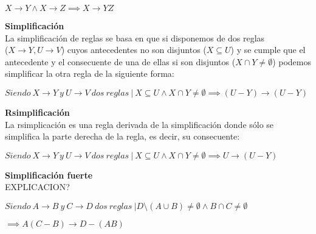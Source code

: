 \begin{center}
    \(X \to Y \wedge X \to Z \implies X \to YZ \)
\end{center}


\bigskip
\textbf{Simplificaci\'on}\\
La simplificaci\'on de reglas se basa en que si disponemos de dos reglas \\ (\(X \to Y , U \to V\)) cuyos antecedentes no son disjuntos (\(X \subseteq U\)) y se cumple que el antecedente y el consecuente de una de ellas si son disjuntos (\(X \cap Y \neq \emptyset\)) podemos simplificar la otra regla de la siguiente forma:

\begin{center}
    \(Siendo \ X \to Y \ y \ U\to V \ dos \ reglas \ | \ X \subseteq U \wedge X \cap Y \neq \emptyset \implies (U - Y) \to (U - Y)\)
\end{center}


\bigskip
\textbf{Rsimplificaci\'on}\\
La rsimplicaci\'on es una regla derivada de la simplificaci\'on donde s\'olo se simplifica la parte derecha de la regla, es decir, su consecuente:

\begin{center}
    \(Siendo \ X \to Y \ y \ U\to V \ dos \ reglas \ | \ X \subseteq U \wedge X \cap Y \neq \emptyset \implies U \to (U - Y)\)
\end{center}


\bigskip

% 
\textbf{Simplificaci\'on fuerte}\\

EXPLICACION?

\begin{center}
    \(Siendo \ A \to B \ y \ C\to D \ dos \ reglas \ | D \setminus (A \cup B) \neq \emptyset \wedge B \cap C \neq \emptyset\)
\end{center}

\begin{center}
    \(\implies A(C-B) \to D - (AB)\)
\end{center}



